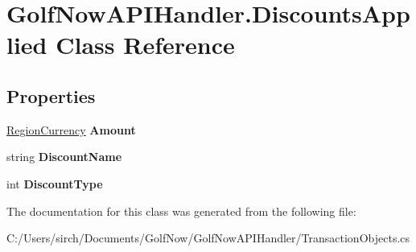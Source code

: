 \hypertarget{class_golf_now_a_p_i_handler_1_1_discounts_applied}{}\section{Golf\+Now\+A\+P\+I\+Handler.\+Discounts\+Applied Class Reference}
\label{class_golf_now_a_p_i_handler_1_1_discounts_applied}
\subsection*{Properties}
\begin{DoxyCompactItemize}
\item 
\mbox{\label{class_golf_now_a_p_i_handler_1_1_discounts_applied_a5d5c7cfefc5f6e3421797fbf5d5ff5b3}} 
\mbox{\hyperlink{class_golf_now_a_p_i_handler_1_1_region_currency}{Region\+Currency}} {\bfseries Amount}
\item 
\mbox{\label{class_golf_now_a_p_i_handler_1_1_discounts_applied_af8225931f46869175a321dec4826b63f}} 
string {\bfseries Discount\+Name}
\item 
\mbox{\label{class_golf_now_a_p_i_handler_1_1_discounts_applied_a490c630205026d19a4278318c32bd8c1}} 
int {\bfseries Discount\+Type}
\end{DoxyCompactItemize}


The documentation for this class was generated from the following file\+:\begin{DoxyCompactItemize}
\item 
C\+:/\+Users/sirch/\+Documents/\+Golf\+Now/\+Golf\+Now\+A\+P\+I\+Handler/Transaction\+Objects.\+cs\end{DoxyCompactItemize}

